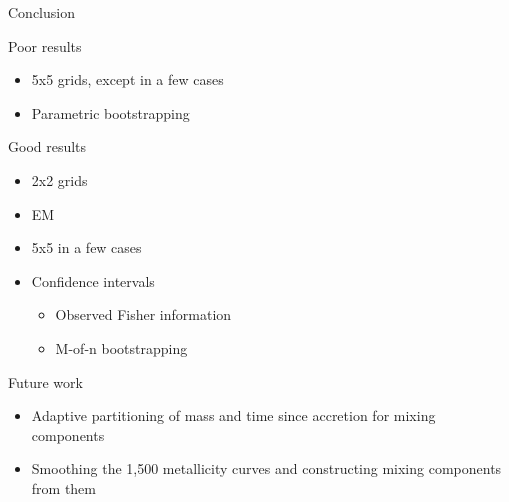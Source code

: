 \documentclass{beamer}
\begin{document}
\begin{frame}{Conclusion}
	
	Poor results
	\begin{itemize}
		\item 5x5 grids, except in a few cases
		\item Parametric bootstrapping
	\end{itemize}	
	
	
	Good results
	\begin{itemize}
		\item 2x2 grids
		\item EM
		\item 5x5 in a few cases
		\item Confidence intervals
		\begin{itemize}
			\item Observed Fisher information
			\item M-of-n bootstrapping
		\end{itemize}
	\end{itemize}	
	
	
	
	
	Future work
	\begin{itemize}
		\item Adaptive partitioning of mass and time since accretion for mixing components
		\item Smoothing the 1,500 metallicity curves and constructing mixing components from them
	\end{itemize}	
	
\end{frame}
\end{document}
